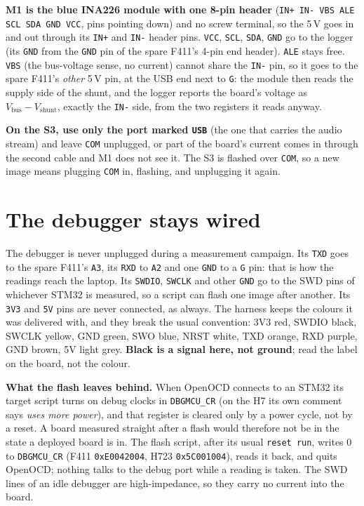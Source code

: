 \documentclass[11pt]{article}
\newcommand{\code}[1]{\texttt{#1}}
\begin{document}
\textbf{M1 is the blue INA226 module with one 8-pin header} (\code{IN+ IN- VBS ALE SCL SDA GND
VCC}, pins pointing down) and no screw terminal, so the 5\,V goes in and out through its
\code{IN+} and \code{IN-} header pins. \code{VCC}, \code{SCL}, \code{SDA}, \code{GND} go to the
logger (its \code{GND} from the \code{GND} pin of the spare F411's 4-pin end header). \code{ALE}
stays free. \code{VBS} (the bus-voltage sense, no current) cannot share the \code{IN-} pin, so it
goes to the spare F411's \emph{other} 5\,V pin, at the USB end next to \code{G}: the module then
reads the supply side of the shunt, and the logger reports the board's voltage as
$V_\text{bus} - V_\text{shunt}$, exactly the \code{IN-} side, from the two registers it reads
anyway.

\textbf{On the S3, use only the port marked \code{USB}} (the one that carries the audio stream)
and leave \code{COM} unplugged, or part of the board's current comes in through the second
cable and M1 does not see it. The S3 is flashed over \code{COM}, so a new image means plugging
\code{COM} in, flashing, and unplugging it again.

\section{The debugger stays wired}

The debugger is never unplugged during a measurement campaign. Its \code{TXD} goes to the spare
F411's \code{A3}, its \code{RXD} to \code{A2} and one \code{GND} to a \code{G} pin: that is how the
readings reach the laptop. Its \code{SWDIO}, \code{SWCLK} and other \code{GND} go to the SWD pins of
whichever STM32 is measured, so a script can flash one image after another. Its \code{3V3} and
\code{5V} pins are never connected, as always.
The harness keeps the colours it was delivered with, and they break the usual convention:
3V3 red, SWDIO black, SWCLK yellow, GND green, SWO blue, NRST white, TXD orange, RXD purple,
GND brown, 5V light grey. \textbf{Black is a signal here, not ground}; read the label on the
board, not the colour.

\textbf{What the flash leaves behind.} When OpenOCD connects to an STM32 its target script turns on
debug clocks in \code{DBGMCU\_CR} (on the H7 its own comment says \emph{uses more power}), and
that register is cleared only by a power cycle, not by a reset. A board measured straight after a
flash would therefore not be in the state a deployed board is in. The flash script, after its
usual \code{reset run}, writes 0 to \code{DBGMCU\_CR} (F411 \code{0xE0042004}, H723
\code{0x5C001004}), reads it back, and quits OpenOCD; nothing talks to the debug port while a
reading is taken. The SWD lines of an idle debugger are high-impedance, so they carry no current
into the board.
\end{document}
